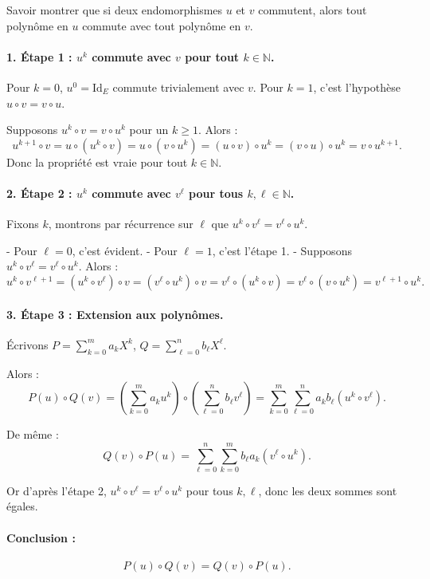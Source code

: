 \documentclass[french, 11pt]{article}
\begin{document}
\begin{exercice}{}{}
    Savoir montrer que si deux endomorphismes $u$ et $v$ commutent, alors tout polynôme en $u$ commute avec tout polynôme en $v$.
    \tcblower
    \paragraph{1. Étape 1 : \(u^k\) commute avec \(v\) pour tout \(k \in \mathbb{N}\).}  

    Pour \(k=0\), \(u^0 = \mathrm{Id}_E\) commute trivialement avec \(v\).  
    Pour \(k=1\), c’est l’hypothèse \(u \circ v = v \circ u\).  

    Supposons \(u^k \circ v = v \circ u^k\) pour un \(k\ge 1\). Alors :  
    \[
    u^{k+1} \circ v = u \circ (u^k \circ v) = u \circ (v \circ u^k) 
    = (u \circ v) \circ u^k = (v \circ u) \circ u^k = v \circ u^{k+1}.
    \]  
    Donc la propriété est vraie pour tout \(k \in \mathbb{N}\).

    \paragraph{2. Étape 2 : \(u^k\) commute avec \(v^\ell\) pour tous \(k, \ell \in \mathbb{N}\).}  

    Fixons \(k\), montrons par récurrence sur \(\ell\) que \(u^k \circ v^\ell = v^\ell \circ u^k\).

    - Pour \(\ell = 0\), c’est évident.
    - Pour \(\ell = 1\), c’est l’étape 1.
    - Supposons \(u^k \circ v^\ell = v^\ell \circ u^k\). Alors :
    \[
    u^k \circ v^{\ell+1} = (u^k \circ v^\ell) \circ v = (v^\ell \circ u^k) \circ v
    = v^\ell \circ (u^k \circ v) = v^\ell \circ (v \circ u^k) = v^{\ell+1} \circ u^k.
    \]

    \paragraph{3. Étape 3 : Extension aux polynômes.}  

    Écrivons \(P = \sum_{k=0}^m a_k X^k\), \(Q = \sum_{\ell=0}^n b_\ell X^\ell\).

    Alors :
    \[
    P(u) \circ Q(v) = \left( \sum_{k=0}^m a_k u^k \right) \circ \left( \sum_{\ell=0}^n b_\ell v^\ell \right)
    = \sum_{k=0}^m \sum_{\ell=0}^n a_k b_\ell \left( u^k \circ v^\ell \right).
    \]

    De même :
    \[
    Q(v) \circ P(u) = \sum_{\ell=0}^n \sum_{k=0}^m b_\ell a_k \left( v^\ell \circ u^k \right).
    \]

    Or d’après l’étape 2, \(u^k \circ v^\ell = v^\ell \circ u^k\) pour tous \(k,\ell\), donc les deux sommes sont égales.

    \paragraph{Conclusion :}  
    \[
    \boxed{P(u) \circ Q(v) = Q(v) \circ P(u)}.
    \]
\end{exercice}
\end{document}
